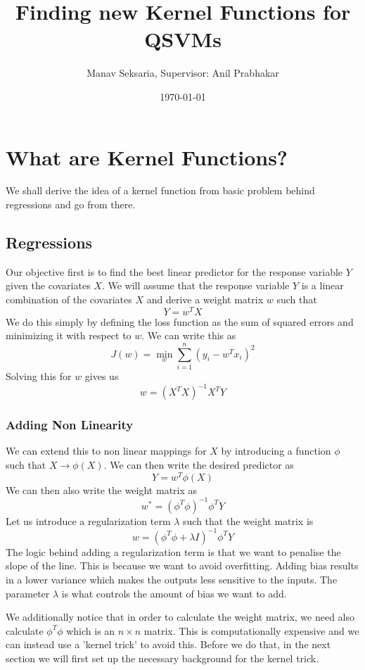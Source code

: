 \documentclass[hidelinks]{book}
\title{Finding new Kernel Functions for QSVMs}
\author{Manav Seksaria, Supervisor: Anil Prabhakar}
\date{\today}
\numberwithin{equation}{section}
\begin{document}
\maketitle

\section{What are Kernel Functions?}
We shall derive the idea of a kernel function from basic problem behind regressions and go from there.

\subsection{Regressions}
  Our objective first is to find the best linear predictor for the response
  variable $Y$ given the covariates $X$. We will assume that the response
  variable $Y$ is a linear combination of the covariates $X$ and derive a
  weight matrix $w$ such that
  $$ Y = w^T X $$ We do this simply by defining the loss function as the sum of
  squared errors and minimizing it with respect to $w$. We can write this as
  $$ J(w) = \min_w \sum_{i=1}^n (y_i - w^T x_i)^2 $$ Solving this for $w$
  gives us
  $$ w = (X^T X)^{-1} X^T Y $$

  \subsubsection{Adding Non Linearity}
  We can extend this to non linear mappings for $X$ by introducing a function $\phi$ such that $X \rightarrow \phi(X)$. We can then write the desired predictor as
  $$ Y = w^T \phi(X) $$ We can then also write the weight matrix as
  $$ w^* = (\phi^T \phi)^{-1} \phi^T Y $$ Let us introduce a regularization term $\lambda$ such that the weight matrix is
  $$ w = (\phi^T \phi + \lambda I)^{-1} \phi^T Y $$ The logic behind adding a regularization term is that we want to penalise the slope of the line. This is because we want to avoid overfitting. Adding bias results in a lower variance which makes the outputs less sensitive to the inputs. The parameter $\lambda$ is what controls the amount of bias we want to add.

  We additionally notice that in order to calculate the weight matrix, we need also calculate $\phi^T \phi$ which is an $n \times n$ matrix. This is computationally expensive and we can instead use a 'kernel trick' to avoid this. Before we do that, in the next section we will first set up the necessary background for the kernel trick.
\end{document}
